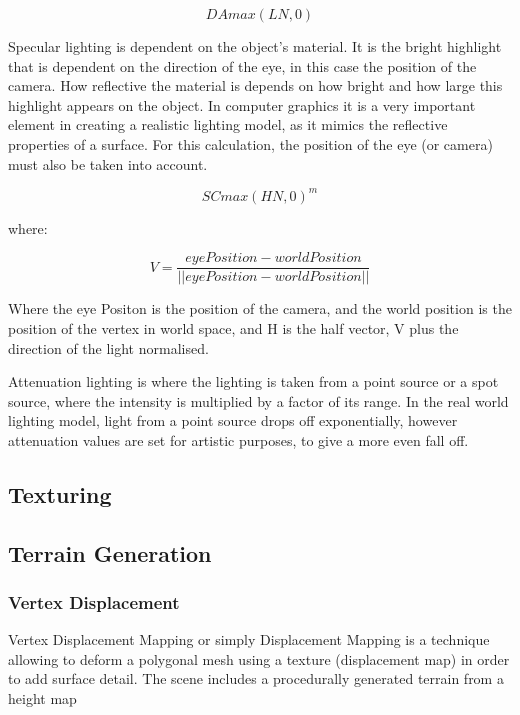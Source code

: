 \documentclass[conference]{acmsiggraph}
\begin{document}
\begin{equation} \label{diffuseLightingEq}
	DA max(L N, 0)
\end{equation}
	
Specular lighting is dependent on the object's material. It is the bright highlight that is dependent on the direction of the eye, in this case the position of the camera. How reflective the material is depends on how bright and how large this highlight appears on the object. In computer graphics it is a very important element in creating a realistic lighting model, as it mimics the reflective properties of a surface. %
For this calculation, the position of the eye (or camera) must also be taken into account. 
	
\begin{equation}
	SC max(H N, 0)^m
\end{equation}
	
where:
	
\begin{equation} 
	V = \frac{eyePosition - worldPosition}{||eyePosition - worldPosition||}
\end{equation}
	
Where the eye Positon is the position of the camera, and the world position is the position of the vertex in world space, and H is the half vector, V plus the direction of the light normalised.

Attenuation lighting is where the lighting is taken from a point source or a spot source, where the intensity is multiplied by a factor of its range. In the real world lighting model, light from a point source drops off exponentially, however attenuation values are set for artistic purposes, to give a more even fall off. 
	
\subsection{Texturing}
	
\subsection{Terrain Generation}
	
\subsubsection{Vertex Displacement}
	
Vertex Displacement Mapping or simply Displacement Mapping is a technique allowing to deform a polygonal mesh using a texture (displacement map) in order to add surface detail. The scene includes a procedurally generated terrain from a height map %
	
\end{document}
